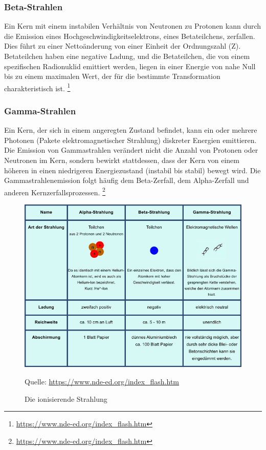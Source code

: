  \subsubsection{Beta-Strahlen}
\grqq Ein Kern mit einem instabilen Verhältnis von Neutronen zu Protonen kann durch die Emission eines Hochgeschwindigkeitselektrons, eines Betateilchens, zerfallen. Dies führt zu einer Nettoänderung von einer Einheit der Ordnungszahl (Z). Betateilchen haben eine negative Ladung, und die Betateilchen, die von einem spezifischen Radionuklid emittiert werden, liegen in einer Energie von nahe Null bis zu einem maximalen Wert, der für die bestimmte Transformation charakteristisch ist.\grqq
\footnote[6]{\url{https://www.nde-ed.org/index_flash.htm}}\\
 \subsubsection{Gamma-Strahlen}
 
\grqq Ein Kern, der sich in einem angeregten Zustand befindet, kann ein oder mehrere Photonen (Pakete elektromagnetischer Strahlung) diskreter Energien emittieren. Die Emission von Gammastrahlen verändert nicht die Anzahl von Protonen oder Neutronen im Kern, sondern bewirkt stattdessen, dass der Kern von einem höheren in einen niedrigeren Energiezustand (instabil bis stabil) bewegt wird. Die Gammastrahlenemission folgt häufig dem Beta-Zerfall, dem Alpha-Zerfall und anderen Kernzerfallsprozessen.\grqq
\footnote[7]{\url{https://www.nde-ed.org/index_flash.htm}}\\

\begin{figure}[htb]
  \centering  
  \includegraphics[scale=0.7]{img/strahlen.png}
  \caption{Die ionisierende Strahlung}
  \label{fig:strahlen}
  Quelle: \url{https://www.nde-ed.org/index_flash.htm}
\end{figure}
